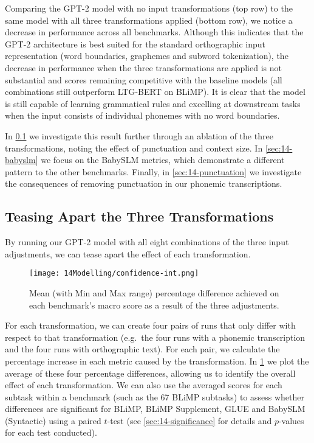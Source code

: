Comparing the \mbox{GPT-2} model with no input transformations (top row) to the same model with all three transformations applied (bottom row), we notice a decrease in performance across all benchmarks. Although this indicates that the \mbox{GPT-2} architecture is best suited for the standard orthographic input representation (word boundaries, graphemes and subword tokenization), the decrease in performance when the three transformations are applied is not substantial and scores remaining competitive with the baseline models (all combinations still outperform LTG-BERT on BLiMP). It is clear that the model is still capable of learning grammatical rules and excelling at downstream tasks when the input consists of individual phonemes with no word boundaries. 

In \cref{sec:14-effect} we investigate this result further through an ablation of the three transformations, noting the effect of punctuation and context size. In \cref{sec:14-babyslm} we focus on the BabySLM metrics, which demonstrate a different pattern to the other benchmarks. Finally, in \cref{sec:14-punctuation} we investigate the consequences of removing punctuation in our phonemic transcriptions.

\subsection{Teasing Apart the Three Transformations}\label{sec:14-effect}

By running our GPT-2 model with all eight combinations of the three input adjustments, we can tease apart the effect of each transformation.

\begin{figure}
    \centering
    \texttt{[image: 14Modelling/confidence-int.png]}
      \caption{Mean (with Min and Max range) percentage difference achieved on each benchmark's macro score as a result of the three adjustments.}
    \label{fix:14-condition-differences}
\vspace{-4mm}
\end{figure}

For each transformation, we can create four pairs of runs that only differ with respect to that transformation (e.g.\ the four runs with a phonemic transcription and the four runs with orthographic text). For each pair, we calculate the percentage increase in each metric caused by the transformation. In \cref{fix:14-condition-differences} we plot the average of these four percentage differences, allowing us to identify the overall effect of each transformation. We can also use the averaged scores for each subtask within a benchmark (such as the 67 BLiMP subtasks) to assess whether differences are significant for BLiMP, BLiMP Supplement, GLUE and BabySLM (Syntactic) using a paired $t$-test (see \cref{sec:14-significance} for details and $p$-values for each test conducted).

